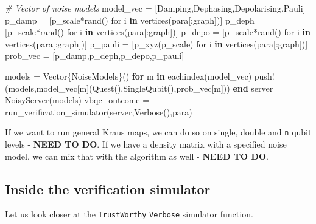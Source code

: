 \documentclass[
]{article}
\newenvironment{Shaded}{}{}
\newcommand{\CommentTok}[1]{\textcolor[rgb]{0.38,0.63,0.69}{\textit{#1}}}
\newcommand{\ControlFlowTok}[1]{\textcolor[rgb]{0.00,0.44,0.13}{\textbf{#1}}}
\newcommand{\DataTypeTok}[1]{\textcolor[rgb]{0.56,0.13,0.00}{#1}}
\newcommand{\FunctionTok}[1]{\textcolor[rgb]{0.02,0.16,0.49}{#1}}
\newcommand{\KeywordTok}[1]{\textcolor[rgb]{0.00,0.44,0.13}{\textbf{#1}}}
\newcommand{\NormalTok}[1]{#1}
\newcommand{\OperatorTok}[1]{\textcolor[rgb]{0.40,0.40,0.40}{#1}}
\begin{document}
\begin{Shaded}
\begin{Highlighting}[]
    \CommentTok{\# Vector of noise models}
\NormalTok{    model\_vec }\OperatorTok{=}\NormalTok{ [Damping,Dephasing,Depolarising,Pauli]}
\NormalTok{    p\_damp }\OperatorTok{=}\NormalTok{ [}\FunctionTok{p\_scale*rand}\NormalTok{() for i }\KeywordTok{in} \FunctionTok{vertices}\NormalTok{(para[}\OperatorTok{:}\NormalTok{graph])]}
\NormalTok{    p\_deph }\OperatorTok{=}\NormalTok{ [}\FunctionTok{p\_scale*rand}\NormalTok{() for i }\KeywordTok{in} \FunctionTok{vertices}\NormalTok{(para[}\OperatorTok{:}\NormalTok{graph])]}
\NormalTok{    p\_depo }\OperatorTok{=}\NormalTok{ [}\FunctionTok{p\_scale*rand}\NormalTok{() for i }\KeywordTok{in} \FunctionTok{vertices}\NormalTok{(para[}\OperatorTok{:}\NormalTok{graph])]}
\NormalTok{    p\_pauli }\OperatorTok{=}\NormalTok{ [}\FunctionTok{p\_xyz}\NormalTok{(p\_scale) for i }\KeywordTok{in} \FunctionTok{vertices}\NormalTok{(para[}\OperatorTok{:}\NormalTok{graph])]}
\NormalTok{    prob\_vec }\OperatorTok{=}\NormalTok{ [p\_damp,p\_deph,p\_depo,p\_pauli]}

\NormalTok{    models }\OperatorTok{=} \FunctionTok{Vector}\DataTypeTok{\{NoiseModels\}}\NormalTok{()}
    \ControlFlowTok{for}\NormalTok{ m }\KeywordTok{in} \FunctionTok{eachindex}\NormalTok{(model\_vec)        }\FunctionTok{push!}\NormalTok{(models,model\_vec[m](}\FunctionTok{Quest}\NormalTok{(),}\FunctionTok{SingleQubit}\NormalTok{(),prob\_vec[m]))}
    \ControlFlowTok{end}
\NormalTok{    server }\OperatorTok{=} \FunctionTok{NoisyServer}\NormalTok{(models)}
\NormalTok{    vbqc\_outcome }\OperatorTok{=} \FunctionTok{run\_verification\_simulator}\NormalTok{(server,}\FunctionTok{Verbose}\NormalTok{(),para)}
\end{Highlighting}
\end{Shaded}

If we want to run general Kraus maps, we can do so on single, double and
\texttt{n} qubit levels - \textbf{NEED TO DO}. If we have a density
matrix with a specified noise model, we can mix that with the algorithm
as well - \textbf{NEED TO DO}.

\subsection{Inside the verification
simulator}\label{inside-the-verification-simulator}

Let us look closer at the \texttt{TrustWorthy} \texttt{Verbose}
simulator function.
\end{document}
